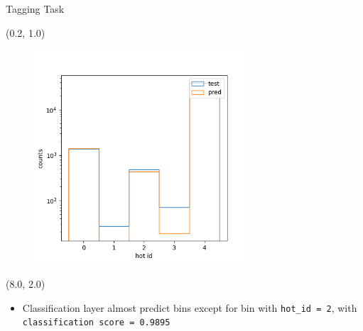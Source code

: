 \documentclass[12pt, xcolor={dvipsnames}, aspectratio = 169]{beamer}
\begin{document}
\begin{frame}[fragile]{Tagging Task}
    \begin{textblock}{8.0}(0.2, 1.0)
        \begin{figure}
            \centering
            \includegraphics[width=8.0cm]{../imgs/cls-hot-id.png}
        \end{figure}
    \end{textblock}
    
    \begin{textblock}{7.0}(8.0, 2.0)
    
    \begin{itemize}
        \item Classification layer almost predict bins except for bin with \verb|hot_id = 2|, with 
        \verb|classification score = 0.9895|
    \end{itemize}
    
    \end{textblock}
    
\end{frame}
\end{document}
